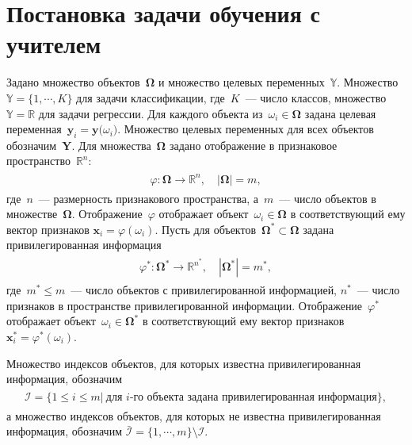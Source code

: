 \documentclass[12pt]{a&t}
\begin{document}
\section{Постановка задачи обучения с учителем}
Задано множество объектов~$\bm{\Omega}$ и множество целевых переменных~$\mathbb{Y}$. Множество~$\mathbb{Y}=\{1,\cdots,K\}$ для задачи классификации, где~$K$~--- число классов, множество~$\mathbb{Y}=\mathbb{R}$ для задачи регрессии.
Для каждого объекта из~$\omega_i \in \bm{\Omega}$ задана целевая переменная~$\mathbf{y}_i = \mathbf{y}\bigr(\omega_i\bigr)$. Множество целевых переменных для всех объектов обозначим~$\mathbf{Y}$.
Для множества~$\bm{\Omega}$ задано отображение в признаковое пространство~$\mathbb{R}^{n}$:
\begin{gather}
\label{eq:st:phi}
\begin{aligned}
\varphi:\bm{\Omega} \to \mathbb{R}^{n}, \quad \left|\bm{\Omega}\right| = m,
\end{aligned}
\end{gather}
где~$n$~--- размерность признакового пространства, а~$m$~--- число объектов в множестве~$\bm{\Omega}$. Отображение~$\varphi$ отображает объект~$\omega_i \in \bm{\Omega}$ в соответствующий ему вектор признаков $\mathbf{x}_i = \varphi(\omega_i)$.
Пусть для объектов~$\bm{\Omega}^* \subset \bm{\Omega}$ задана привилегированная информация
\begin{gather}
\label{eq:st:phi*}
\begin{aligned}
\varphi^*:\bm{\Omega}^* \to \mathbb{R}^{n^*}, \quad \left|\bm{\Omega}^*\right| = m^*,
\end{aligned}
\end{gather}
где~$m^* \leq m$~--- число объектов с привилегированной информацией, $n^*$~--- число признаков в пространстве привилегированной информации. Отображение~$\varphi^*$ отображает объект~$\omega_i \in \bm{\Omega^*}$ в соответствующий ему вектор признаков $\mathbf{x}^*_i = \varphi^*(\omega_i)$.

Множество индексов объектов, для которых известна привилегированная информация, обозначим
\begin{gather}
\label{eq:st:3}
\begin{aligned}
\mathcal{I} = \{1 \leq i \leq m |~\text{для $i$-го объекта задана привилегированная информация}\},
\end{aligned}
\end{gather}
а множество индексов объектов, для которых не известна привилегированная информация, обозначим $\bar{\mathcal{I}}=\{1, \cdots, m\}\setminus \mathcal{I}$.
\end{document}
